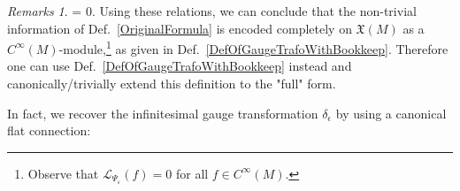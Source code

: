 \documentclass[a4paper,oneside,11pt,leqno]{scrartcl} %
\theoremstyle{plain}
\theoremstyle{remark}
\newtheorem{remark}[theorem]{Remarks}
\theoremstyle{definition}
\begin{document}
\begin{remark}
=
0.
\eas
Using these relations, we can conclude that the non-trivial information of Def.~\eqref{OriginalFormula} is encoded completely on $\mathfrak{X}(M)$ as a $C^\infty(M)$-module,\footnote{Observe that $\mathcal{L}_{\Psi_\varepsilon}(f) = 0$ for all $f \in C^\infty(M)$.} as given in Def.~\eqref{DefOfGaugeTrafoWithBookkeep}. Therefore one can use Def.~\eqref{DefOfGaugeTrafoWithBookkeep} instead and canonically/trivially extend this definition to the "full" form.
%
\end{remark}

In fact, we recover the infinitesimal gauge transformation $\delta_\epsilon$ by using a canonical flat connection:
\end{document}

